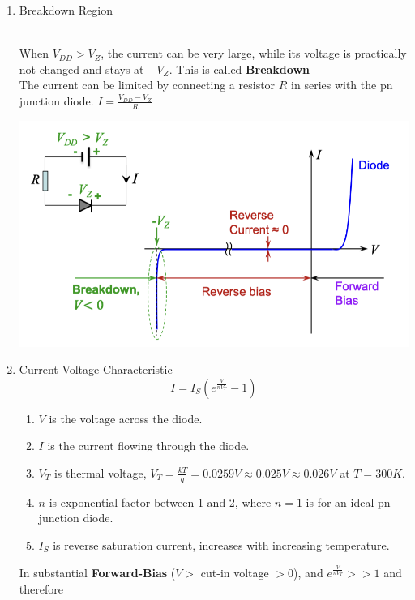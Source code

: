 \begin{enumerate}
\begin{minipage}{0.6\textwidth}
    \end{minipage}
    \item Breakdown Region\\
    \\
    \begin{minipage}{0.4\textwidth}
        When $\displaystyle V_{DD} > V_Z$, the current can be very large, while its voltage is practically not changed and stays at $-V_Z$. This is called \textbf{Breakdown}\\
        The current can be limited by connecting a resistor $R$ in series with the pn junction diode. $\displaystyle I = \frac{V_{DD}-V_Z}{R}$
    \end{minipage}
    \begin{minipage}{0.6\textwidth}
        \includegraphics[width=1\linewidth]{image/breakdownregion.png}
    \end{minipage}
    \item Current Voltage Characteristic
    \[I = I_S(e^{\frac{V}{nV_T}}-1)\]
    \begin{enumerate}
        \item $V$ is the voltage across the diode.
        \item  $I$ is the current flowing through the diode.
        \item $V_T$ is thermal voltage, $\displaystyle V_T = \frac{kT}{q} = 0.0259V \approx 0.025V \approx 0.026V$ at $T = 300K$.
        \item $n$ is exponential factor between 1 and 2, where $n = 1$ is for an ideal pn-junction diode.
        \item $I_S$ is reverse saturation current, increases with increasing temperature.
    \end{enumerate}
    In substantial \textbf{Forward-Bias} ($V>$ cut-in voltage $> 0$), and $\displaystyle e^{\frac{V}{nV_T}} >> 1$ and therefore

\end{enumerate}
